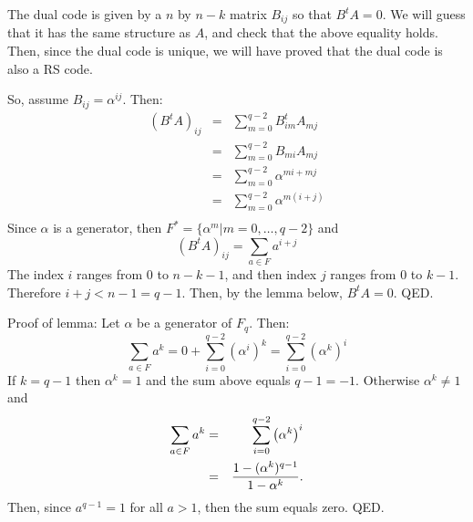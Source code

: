 \documentclass[11pt]{article} \usepackage{amssymb}
\begin{document}
The dual code is given by a $n$ by $n-k$ matrix $B_{ij}$ so that
$B^tA=0$. We will guess that it has the same structure as $A$, and check
that the above equality holds. Then, since the dual code is unique, we
will have proved that the dual code is also a RS code.

So, assume $B_{ij}=\alpha^{ij}$. Then: 
\begin{eqnarray*}
 (B^tA)_{ij}&=&\sum_{m=0}^{q-2}B^t_{im}A_{mj}\\
 &=& \sum_{m=0}^{q-2}B_{mi}A_{mj}\\
 &=& \sum_{m=0}^{q-2}\alpha^{mi+mj}\\
 &=& \sum_{m=0}^{q-2}\alpha^{m(i+j)}\\
\end{eqnarray*}
Since $\alpha$ is a generator, then $F^*=\{\alpha^m | m=0,\ldots,q-2\}$ and
\begin{equation*}
 (B^tA)_{ij} = \sum_{a\in F}a^{i+j}
\end{equation*}
The index $i$ ranges from $0$ to $n-k-1$, and then index $j$ ranges from
$0$ to $k - 1$. Therefore $i+j< n-1=q-1$.  Then, by the
lemma below, $B^tA=0$. QED.

Proof of lemma: Let $\alpha$ be a generator of $F_q$. Then:
\begin{equation*}
  \sum_{a\in F}a^k=0+\sum_{i=0}^{q-2}\left(\alpha^i\right)^k
=\sum_{i=0}^{q-2}\left(\alpha^k\right)^i
\end{equation*}
If $k=q-1$ then $\alpha^k=1$ and the sum above equals $q-1 = -1$.
Otherwise $\alpha^k\not = 1$ and
\begin{eqnarray*}
  \sum_{a\in F}a^k
  &=&\sum_{i=0}^{q-2}\left(\alpha^k\right)^i\\
  &=&{1-(\alpha^k)^{q-1}\over 1-\alpha^k}.\\
\end{eqnarray*}
Then, since $a^{q-1}=1$ for all $a>1$, then the sum equals zero. QED.
\end{document}
